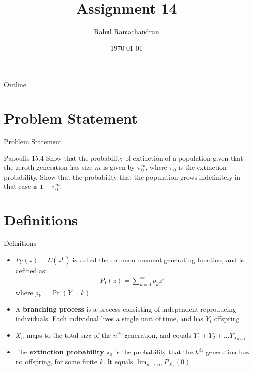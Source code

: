 \documentclass{beamer}
\title{Assignment 14}
\author{Rahul Ramachandran}
\date{\today}
\providecommand{\pr}[1]{\ensuremath{\Pr\left(#1\right)}}
\begin{document}
\begin{frame}
    \titlepage 
\end{frame}

\logo{}


\begin{frame}{Outline}
    \tableofcontents
\end{frame}



\section{Problem Statement}
\begin{frame}{Problem Statement}
    \begin{block}{Papoulis 15.4} Show that the probability of extinction of a population given that the zeroth generation has size $m$ is given by $\pi_0^m$, where $\pi_0$ is the extinction probability. Show that the probability that the population grows indefinitely in that case is $1-\pi_0^m$.
    \end{block}
\end{frame}

\section{Definitions}
\begin{frame}{Definitions}

\begin{itemize}
    \item $P_Y(z) = E(z^Y)$ is called the common moment generating function, and is defined as:
    \begin{align}
         P_Y(z) = \sum_{k=0}^\infty p_kz^k
    \end{align}
    where $p_k = \pr{Y=k}$
    \item A \textbf{branching process} is a process consisting of independent reproducing individuals. Each individual lives a single unit of time, and has $Y_{i}$ offspring
    \item $X_n$ maps to the total size of the $n^{\text{th}}$ generation, and equals $Y_1 + Y_2 + \ldots Y_{X_{n-1}}$
    \item The \textbf{extinction probability} $\pi_0$ is the probability that the $k^{\text{th}}$ generation has no offspring, for some finite $k$. It equals $\displaystyle{\lim_{n \rightarrow \infty} P_{X_n}(0)}$
\end{itemize}


    
\end{frame}
\end{document}
